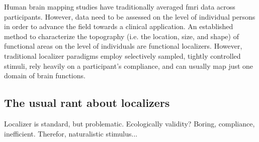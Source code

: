 

Human brain mapping studies have traditionally averaged \ac{fmri} data across
participants.
%
However, data need to be assessed on the level of individual persons in order to
advance the field towards a clinical application.
An established method to characterize the topography (i.e. the location, size,
and shape) of functional areas on the level of individuals are functional
localizers.
However, traditional localizer paradigms employ selectively sampled, tightly
controlled stimuli, rely heavily on a participant's compliance, and can usually
map just one domain of brain functions.


\subsection{The usual rant about localizers}



%
Localizer is standard, but problematic.
%
Ecologically validity?
%
Boring, compliance, inefficient.
%
Therefor, naturalistic stimulus...

